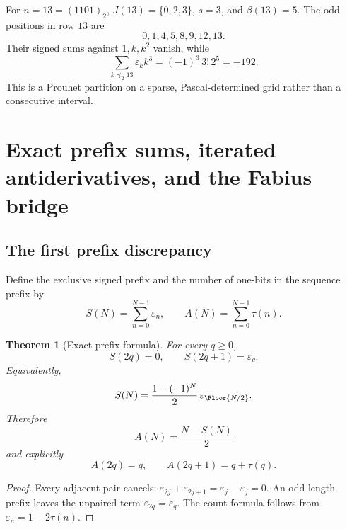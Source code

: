 \documentclass[11pt,oneside]{article}
\numberwithin{equation}{section}
\newtheorem{theorem}{Theorem}[section]
\theoremstyle{definition}
\theoremstyle{remark}
\newcommand{\eps}{\varepsilon}
\newcommand{\submask}{\mathrel{\preccurlyeq_2}}
\begin{document}
\begin{example}
For \(n=13=(1101)_2\),
\(J(13)=\{0,2,3\}\), \(s=3\), and \(\beta(13)=5\).  The odd positions in
row \(13\) are
\[
 0,1,4,5,8,9,12,13.
\]
Their signed sums against \(1,k,k^2\) vanish, while
\[
 \sum_{k\submask13}\eps_kk^3=(-1)^3\,3!\,2^5=-192.
\]
This is a Prouhet partition on a sparse, Pascal-determined grid rather than a
consecutive interval.
\end{example}

\section[Prefix sums and the Fabius bridge]{Exact prefix sums, iterated antiderivatives, and the Fabius bridge}
\label{p1:sec:prefix-fabius}

\subsection{The first prefix discrepancy}

Define the exclusive signed prefix and the number of one-bits in the sequence
prefix by
\begin{equation}
  S(N)=\sum_{n=0}^{N-1}\eps_n,
  \qquad
  A(N)=\sum_{n=0}^{N-1}\tau(n).
  \label{p1:eq:prefix-definitions}
\end{equation}

\begin{theorem}[Exact prefix formula]
\label{p1:thm:exact-prefix}
For every \(q\ge0\),
\begin{equation}
  \boxed{
  S(2q)=0,
  \qquad
  S(2q+1)=\eps_q.}
  \label{p1:eq:exact-prefix}
\end{equation}
Equivalently,
\begin{equation}
  S(N)=\frac{1-(-1)^N}{2}\,
       \eps_{\Floor{N/2}}.
  \label{p1:eq:compact-prefix}
\end{equation}
Therefore
\begin{equation}
  \boxed{
  A(N)=\frac{N-S(N)}2}
  \label{p1:eq:ones-prefix}
\end{equation}
and explicitly
\begin{equation}
  A(2q)=q,
  \qquad
  A(2q+1)=q+\tau(q).
  \label{p1:eq:ones-prefix-cases}
\end{equation}
\end{theorem}

\begin{proof}
Every adjacent pair cancels:
\(\eps_{2j}+\eps_{2j+1}=\eps_j-\eps_j=0\).  An odd-length prefix leaves the
unpaired term \(\eps_{2q}=\eps_q\).  The count formula follows from
\(\eps_n=1-2\tau(n)\).
\end{proof}
\end{document}
